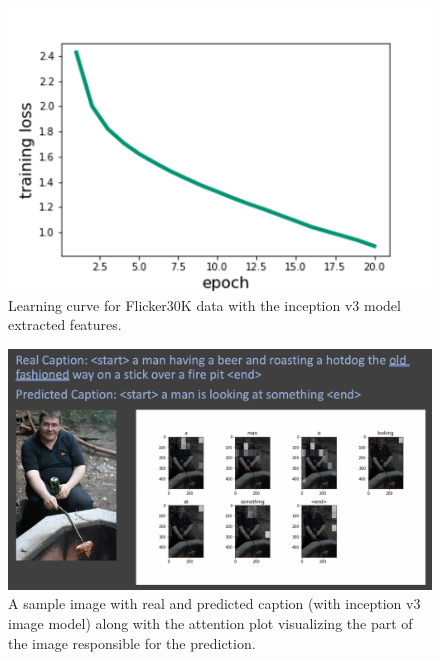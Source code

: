 \documentclass[12pt]{article}
\begin{document}
\begin{figure}[h!]
\begin{center}
\includegraphics[width=7in]{FILR.png}
\end{center}
\caption{\label{fig:FILR}
Learning curve for Flicker30K data with the inception v3 model extracted features.}
\end{figure}

\begin{figure}[h!]
\begin{center}
\includegraphics[width=7in]{FI_1.png}
\end{center}
\caption{\label{fig:FI_1}
A sample image with real and predicted caption (with inception v3 image model) along with the attention plot visualizing the part of the image responsible for the prediction.}
\end{figure}
\end{document}

